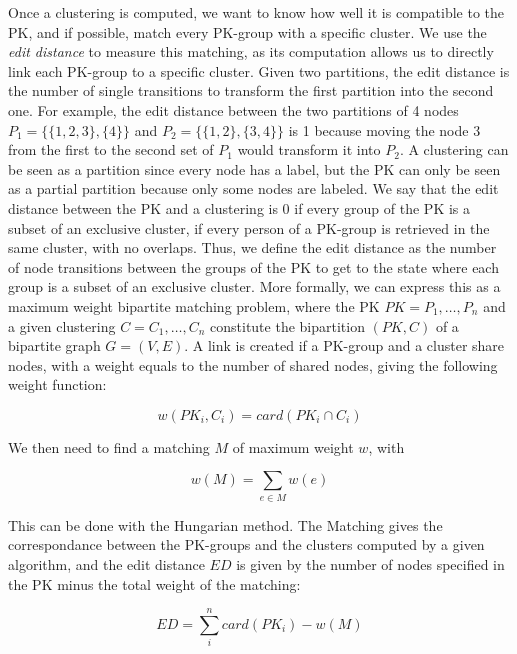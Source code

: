 Once a clustering is computed, we want to know how well it is compatible to the PK, and if possible, match every PK-group with a specific cluster.
We use the \textit{edit distance} to measure this matching, as its computation allows us to directly link each PK-group to a specific cluster.
Given two partitions, the edit distance is the number of single transitions to transform the first partition into the second one.
For example, the edit distance between the two partitions of 4 nodes $ P_1 = \{\{1,2,3\}, \{4\}\}$ and  $ P_2 = \{\{1,2\}, \{3,4\}\}$ is 1 because moving the node $3$ from the first to the second set of $P_1$ would transform it into $P_2$.
A clustering can be seen as a partition since every node has a label, but the PK can only be seen as a partial partition because only some nodes are labeled.
We say that the edit distance between the PK and a clustering is 0 if every group of the PK is a subset of an exclusive cluster, \ie if every person of a PK-group is retrieved in the same cluster, with no overlaps.
Thus, we define the edit distance as the number of node transitions between the groups of the PK to get to the state where each group is a subset of an exclusive cluster. %
More formally, we can express this as a maximum weight bipartite matching problem\cite{konovalovPartitiondistanceAssignmentProblem2005}, where the PK $PK = {P_1, \dotsc, P_n}$ and a given clustering $C = {C_1, \dotsc, C_n}$ constitute the bipartition $(PK, C)$ of a bipartite graph $G = (V, E)$.
A link is created if a PK-group and a cluster share nodes, with a weight equals to the number of shared nodes, giving the following weight function:

\begin{equation}
    w(PK_i, C_i) = card(PK_i \cap C_i)
\end{equation}

We then need to find a matching $M$ of maximum weight $w$, with

\begin{equation}
    w(M) = \sum_{e \in M}w(e)
\end{equation}

This can be done with the Hungarian method\cite{kuhnHungarianMethodAssignment1955}. The Matching gives the correspondance between the PK-groups and the clusters computed by a given algorithm, and the edit distance $ED$ is given by the number of nodes specified in the PK minus the total weight of the matching:

\begin{equation}
    ED = \sum_{i}^{n}card(PK_i) - w(M)
\end{equation}

